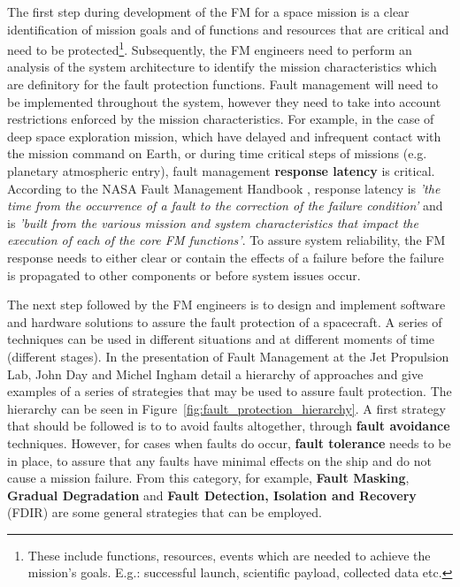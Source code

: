 The first step during development of the FM for a space mission is a clear
identification of mission goals and of functions and resources that are critical
and need to be protected\footnote{These include functions, resources, events
which are needed to achieve the mission's goals. E.g.: successful launch,
scientific payload, collected data etc. }. Subsequently, the FM engineers need
to perform an analysis of the system architecture to identify the mission
characteristics which are definitory for the fault protection functions. Fault
management will need to be implemented throughout the system, however they need
to take into account restrictions enforced by the mission characteristics. For
example, in the case of deep space exploration mission, which have delayed and
infrequent contact with the mission command on Earth, or during time critical
steps of missions (e.g. planetary atmospheric entry), fault management
\textbf{response latency} is critical. According to the NASA Fault Management
Handbook \cite{nasa-fm-handbook}, response latency is \textit{'the time from the
occurrence of a fault to the correction of the failure condition'} and is
\textit{'built from the various mission and system characteristics that impact
the execution of each of the core FM functions'}. To assure system reliability,
the FM response needs to either clear or contain the effects of a failure before
the failure is propagated to other components or before system issues occur.

The next step followed by the FM engineers is to design and implement software
and hardware solutions to assure the fault protection of a spacecraft. A series
of techniques can be used in different situations and at different moments of
time (different stages). In the presentation of Fault Management at the Jet
Propulsion Lab\cite{fm-jpl}, John Day and Michel Ingham detail a hierarchy of
approaches and give examples of a series of strategies that may be used to
assure fault protection. The hierarchy can be seen in
Figure~\ref{fig:fault_protection_hierarchy}. A first strategy that should be
followed is to to avoid faults altogether, through \textbf{fault avoidance}
techniques. However, for cases when faults do occur, \textbf{fault tolerance}
needs to be in place, to assure that any faults have minimal effects on the ship
and do not cause a mission failure. From this category, for example,
\textbf{Fault Masking}, \textbf{Gradual Degradation} and \textbf{Fault
Detection, Isolation and Recovery} (FDIR) are some general strategies that can
be employed.

